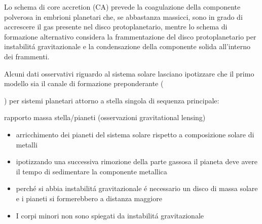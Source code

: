 \documentclass[twoside,11pt,fleqn]{memoir}%
\begin{document}
\begin{workout}
Lo schema di core accretion (CA) prevede la coagulazione della componente polverosa in embrioni planetari che, se abbastanza massicci, sono in grado di accrescere il gas presente nel disco protoplanetario, mentre lo schema di formazione alternativo considera la frammentazione del disco protoplanetario per instabilit\'a gravitazionale e la condensazione della componente solida all'interno dei frammenti.

Alcuni dati osservativi riguardo al sistema solare lasciano ipotizzare che il primo modello sia il canale di formazione preponderante (\begin{workout}\end{workout}) per sistemi planetari attorno a stella singola di sequenza principale:
\begin{workout}
	rapporto massa stella/pianeti (osservazioni gravitational lensing)
\end{workout}
\begin{itemize}
	\item arricchimento dei pianeti del sistema solare rispetto a composizione solare di metalli%
	\item ipotizzando una successiva rimozione della parte gassosa il pianeta deve avere il tempo di sedimentare la componente metallica
	\item perch\'e si abbia instabilit\'a gravitazionale \'e necessario un disco di massa solare e i pianeti si formerebbero a distanza maggiore
	\item I corpi minori non sono spiegati da instabilit\'a gravitazionale
\end{itemize}
\end{workout}

\cleartorecto
\end{document}
